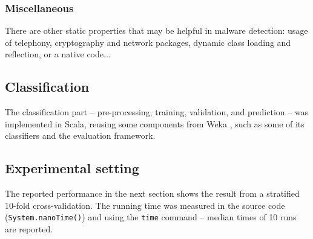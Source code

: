 \subsubsection{Miscellaneous}
There are other static properties that may be helpful in malware detection: usage of telephony, cryptography and network packages, dynamic class loading and reflection, or a native code...

\subsection{Classification}
The classification part -- pre-processing, training, validation, and prediction -- was implemented in Scala, reusing some components from Weka \cite{weka}, such as some of its classifiers and the evaluation framework.

\subsection{Experimental setting}
The reported performance in the next section shows the result from a stratified 10-fold cross-validation. The running time was measured in the source code (\texttt{System.nanoTime()}) and using the \texttt{time} command -- median times of 10 runs are reported.